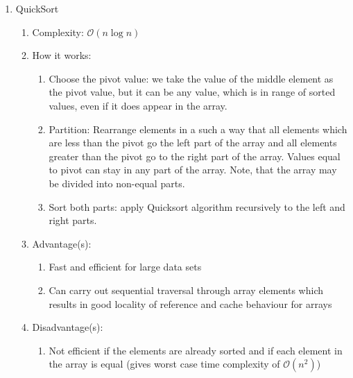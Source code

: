 \documentclass [12pt, executivepaper]{article}
\begin{document}
\begin{enumerate}

\item QuickSort

\begin{enumerate}

\item Complexity: $\mathcal{O}(n \log{} n)$

\item How it works:

\begin{enumerate}

\item Choose the pivot value: we take the value of the middle element as the pivot value, but it can be any value, which is in range of sorted values, even if it does appear in the array.

\item Partition: Rearrange elements in a such a way that all elements which are less than the pivot go the left part of the array and all elements greater than the pivot go to the right part of the array. Values equal to pivot can stay in any part of the array. Note, that the array may be divided into non-equal parts.

\item Sort both parts: apply Quicksort algorithm recursively to the left and right parts. 

\end{enumerate}

\item Advantage(s):

\begin{enumerate}

\item Fast and efficient for large data sets

\item Can carry out sequential traversal through array elements which results in good locality of reference and cache behaviour for arrays

\end{enumerate}

\item Disadvantage(s):

\begin{enumerate}

\item Not efficient if the elements are already sorted and if each element in the array is equal (gives worst case time complexity of $\mathcal{O}(n^2)$)


\end{enumerate}
\end{enumerate}
\end{enumerate}
\end{document}
